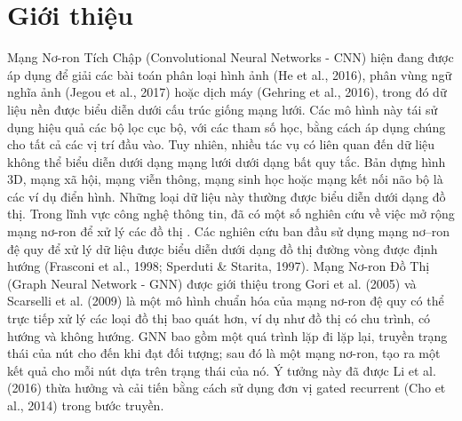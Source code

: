 \chapter{Giới thiệu}
\label{chap:Giới thiệu}


Mạng Nơ-ron Tích Chập (Convolutional Neural Networks - CNN) hiện đang được áp dụng để giải các bài toán phân loại hình ảnh (He et al., 2016), phân vùng ngữ nghĩa ảnh (Jegou et al., 2017) hoặc dịch máy (Gehring et al., 2016), trong đó dữ liệu nền được biểu diễn dưới cấu trúc giống mạng lưới. Các mô hình này tái sử dụng hiệu quả các bộ lọc cục bộ, với các tham số học, bằng cách áp dụng chúng cho tất cả các vị trí đầu vào.
Tuy nhiên, nhiều tác vụ có liên quan đến dữ liệu không thể biểu diễn dưới dạng mạng lưới dưới dạng bất quy tắc. Bản dựng hình 3D, mạng xã hội, mạng viễn thông, mạng sinh học hoặc mạng kết nối não bộ là các ví dụ điển hình. Những loại dữ liệu này thường được biểu diễn dưới dạng đồ thị.
Trong lĩnh vực công nghệ thông tin, đã có một số nghiên cứu về việc mở rộng mạng nơ-ron để xử lý các đồ thị . Các nghiên cứu ban đầu sử dụng mạng nơ–ron đệ quy để xử lý dữ liệu được biểu diễn dưới dạng đồ thị đường vòng được định hướng (Frasconi et al., 1998; Sperduti \& Starita, 1997). Mạng Nơ-ron Đồ Thị (Graph Neural Network - GNN) được giới thiệu trong Gori et al. (2005) và Scarselli et al. (2009) là một mô hình chuẩn hóa của mạng nơ-ron đệ quy có thể trực tiếp xử lý các loại đồ thị bao quát hơn, ví dụ như đồ thị có chu trình, có hướng và không hướng. GNN bao gồm một quá trình lặp đi lặp lại, truyền trạng thái của nút cho đến khi đạt đối tượng; sau đó là một mạng nơ-ron, tạo ra một kết quả cho mỗi nút dựa trên trạng thái của nó. Ý tưởng này đã được Li et al. (2016) thừa hưởng và cải tiến bằng cách sử dụng đơn vị gated recurrent (Cho et al., 2014) trong bước truyền.

